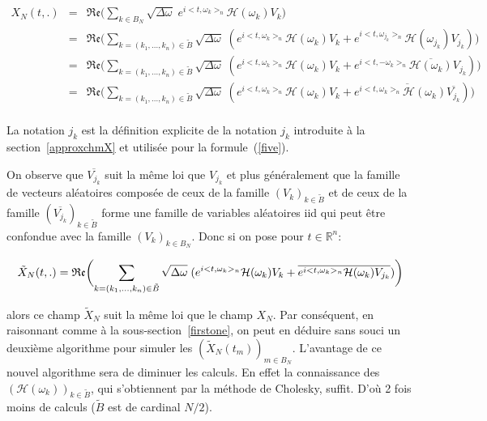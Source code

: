 \begin{eqnarray*}
X_N(t, .) &=&  \mathfrak{Re}\biggl(\displaystyle\sum_{k \in B_N} \sqrt{\Delta\omega} \; e^{i<t,\omega_k>_{n}}\mathcal{H}(\omega_k)V_k\biggr) \\
&=& \mathfrak{Re}\biggl(\displaystyle\sum_{k = (k_1,\dots, k_n) \in \tilde{B}} \sqrt{\Delta\omega} \;( e^{i<t,\omega_k>_{n}}\mathcal{H}(\omega_k)V_k + e^{i<t,\omega_{j_k}>_{n}}\mathcal{H}(\omega_{j_k})V_{j_k}) \biggl) \\
&=& \mathfrak{Re}\biggl(\displaystyle\sum_{k = (k_1,\dots, k_n) \in \tilde{B}} \sqrt{\Delta\omega} \;( e^{i<t,\omega_k>_{n}}\mathcal{H}(\omega_k)V_k + e^{i<t,-\omega_k>_{n}}\overline{\mathcal{H}(\omega_k)}V_{j_k})\biggl) \\
&=& \mathfrak{Re}\biggl(\displaystyle\sum_{k = (k_1,\dots, k_n) \in \tilde{B}} \sqrt{\Delta\omega} \;( e^{i<t,\omega_k>_{n}}\mathcal{H}(\omega_k)V_k + \overline{e^{i<t,\omega_k>_{n}}\mathcal{H}(\omega_k)\overline{V_{j_k}}}) \biggl) \\
\end{eqnarray*}



\begin{remark}
  La notation $j_k$ est la définition explicite de la notation $j_k$ introduite à la section~\ref{approxchmX} et utilisée pour la formule~(\ref{five}).
\end{remark}


On observe que $\overline{V_{j_k}}$ suit la même loi que $V_{j_k}$ et plus généralement que la famille de vecteurs aléatoires composée de ceux de la famille $(V_k)_{k \in \tilde{B}}$ et de ceux de la famille $(\overline{V_{j_k}})_{k \in \tilde{B}}$ forme une famille de variables aléatoires iid qui peut être confondue avec la famille $(V_k)_{k \in B_N}$. Donc si on pose pour $t \in \mathbb{R}^n$:

\footnotesize{
\begin{equation}
\tilde{X}_N(t, .) =  \mathfrak{Re}\biggl(\displaystyle\sum_{k = (k_1,\dots, k_n) \in \tilde{B}} \sqrt{\Delta\omega} \;( e^{i<t,\omega_k>_{n}}\mathcal{H}(\omega_k)V_k + \overline{e^{i<t,\omega_k>_{n}}\mathcal{H}(\omega_k)V_{j_k}}) \biggr)\\
\end{equation}
}

\normalsize{
  \noindent alors ce champ $\tilde{X}_N$ suit la même loi que le champ $X_N$. Par conséquent, en raisonnant comme à la sous-section~\ref{firstone}, on peut en déduire sans souci un deuxième algorithme
  pour simuler les $(\tilde{X}_N(t_m))_{m \in B_N}$. L'avantage de ce nouvel algorithme sera de diminuer les calculs. En effet la connaissance des $(\mathcal{H}(\omega_k))_{k \in \tilde{B}}$, qui s'obtiennent
  par la méthode de Cholesky, suffit. D'où 2 fois moins de calculs ($\tilde{B}$ est de cardinal $N/2$).}


